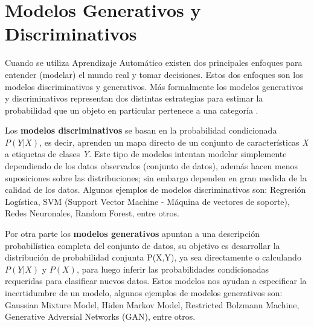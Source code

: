 \section{Modelos Generativos y Discriminativos}

Cuando se utiliza Aprendizaje Autom\'{a}tico existen dos principales enfoques para entender (modelar) el mundo real y tomar decisiones. Estos dos enfoques son los modelos discriminativos y generativos. M\'{a}s formalmente los modelos generativos y discriminativos representan dos distintas estrategias para estimar la probabilidad que un objeto en particular pertenece a una categor\'{i}a \cite{42}.


\vspace{5mm} %

Los \textbf{modelos discriminativos} se basan en la probabilidad condicionada $P(Y|X)$, es decir, aprenden un mapa directo de un conjunto de caracter\'{i}sticas \textit{X} a etiquetas de clases \textit{Y}. Este tipo de modelos intentan modelar simplemente dependiendo de los datos observados (conjunto de datos), adem\'{a}s hacen menos suposiciones sobre las distribuciones; sin embargo dependen en gran medida de la calidad de los datos. Algunos ejemplos de modelos discriminativos son: Regresi\'{o}n Log\'{i}stica, SVM (Support Vector Machine - M\'{a}quina de vectores de soporte), Redes Neuronales, Random Forest, entre otros.

\vspace{5mm} %

Por otra parte los \textbf{modelos generativos} apuntan a una descripci\'{o}n probabil\'{i}stica completa del conjunto de datos, su objetivo es desarrollar la distribuci\'{o}n de probabilidad conjunta P(X,Y), ya sea directamente o calculando $P(Y|X)$ y $P(X)$, para luego inferir las probabilidades condicionadas requeridas para clasificar nuevos datos. Estos modelos nos ayudan a especificar la incertidumbre de un modelo, algunos ejemplos de modelos generativos son: Gaussian Mixture Model, Hiden Markov Model, Restricted Bolzmann Machine, Generative Adversial Networks (GAN), entre otros.

\vspace{5mm} %

